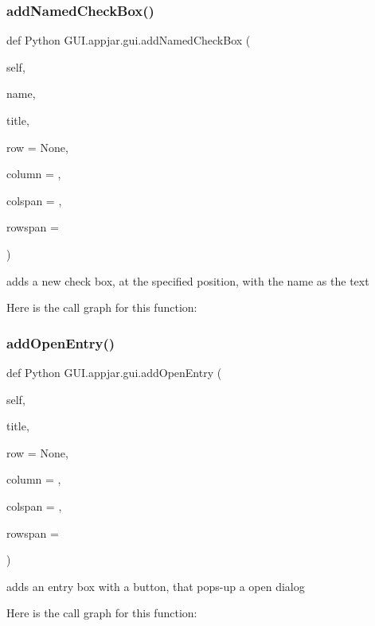 \subsubsection{\texorpdfstring{add\+Named\+Check\+Box()}{addNamedCheckBox()}}
{\footnotesize\ttfamily def Python G\+U\+I.\+appjar.\+gui.\+add\+Named\+Check\+Box (\begin{DoxyParamCaption}\item[{}]{self,  }\item[{}]{name,  }\item[{}]{title,  }\item[{}]{row = {\ttfamily None},  }\item[{}]{column = {},  }\item[{}]{colspan = {},  }\item[{}]{rowspan = {} }\end{DoxyParamCaption})}

\begin{DoxyVerb}adds a new check box, at the specified position, with the name as the text \end{DoxyVerb}
 Here is the call graph for this function\+:
\mbox{\label{class_python_01_g_u_i_1_1appjar_1_1gui_ab9cfd0b46585f9799c26748b92d82f47}} 
\subsubsection{\texorpdfstring{add\+Open\+Entry()}{addOpenEntry()}}
{\footnotesize\ttfamily def Python G\+U\+I.\+appjar.\+gui.\+add\+Open\+Entry (\begin{DoxyParamCaption}\item[{}]{self,  }\item[{}]{title,  }\item[{}]{row = {\ttfamily None},  }\item[{}]{column = {},  }\item[{}]{colspan = {},  }\item[{}]{rowspan = {} }\end{DoxyParamCaption})}

\begin{DoxyVerb}adds an entry box with a button, that pops-up a open dialog \end{DoxyVerb}
 Here is the call graph for this function\+:
\mbox{\label{class_python_01_g_u_i_1_1appjar_1_1gui_a5dad85912393d493590c816a1a7cb29e}} 
